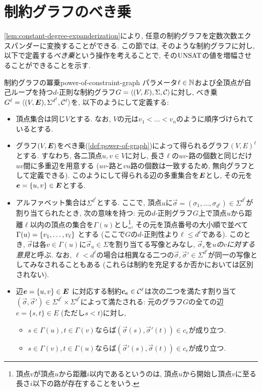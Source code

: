 \section{制約グラフのべき乗}

\cref{lem:constant-degree-expanderization}により, 任意の制約グラフを定数次数エクスパンダーに変換することができる.
この節では, そのような制約グラフに対し, 以下で定義する\emph{べき乗}という操作を考えることで, その$\mathrm{UNSAT}$の値を増幅させることができることを示す.

\begin{definition}{制約グラフの冪乗}{power-of-constraint-graph}
  パラメータ$\ell\in\mathbb{N}$および全頂点が自己ループを持つ$d$-正則な制約グラフ$G=\langle(V,E),\Sigma,\mathcal{C}\rangle$に対し, べき乗$G^\ell = \langle(V,\boldsymbol{E}),\Sigma^{d^{\ell}},\mathcal{C}^\ell\rangle$を, 以下のようにして定義する:
  \begin{itemize}
    \item 頂点集合は同じ$V$とする. なお, $V$の元は$v_1<\dots < v_n$のように順序づけられているとする.
    \item グラフ$(V,\boldsymbol{E})$をべき乗(\cref{def:power-of-graph})によって得られるグラフ$(V,E)^\ell$とする. すなわち, 各二頂点$u,v\in V$に対し, 長さ$\ell$の$uv$-路の個数と同じだけ$uv$間に多重辺を用意する ($uv$-路と$vu$路の個数は一致するため, 無向グラフとして定義できる). このようにして得られる辺の多重集合を$\boldsymbol{E}$とし, その元を$\boldsymbol{e} = \{u,v\} \in \boldsymbol{E}$とする.
    \item アルファベット集合は$\Sigma^{d^{\ell}}$とする. ここで, 頂点$u$に$\vec{\sigma}=(\sigma_1,\dots,\sigma_{d^{\ell}}) \in \Sigma^{d^{\ell}}$が割り当てられたとき, 次の意味を持つ: 元の$d$-正則グラフ$G$上で頂点$u$から距離$\ell$以内の頂点の集合を$\Gamma(u)$とし\footnote{頂点$v$が頂点$u$から距離$i$以内であるというのは, 頂点$u$から開始し頂点$v$に至る長さ$i$以下の路が存在することをいう.}, その元を頂点番号の大小順で並べて$\Gamma(u)=\qty{ v_1,\dots,v_\ell}$ とする (ここで$G$の$d$-正則性より$\ell \le d^{\ell}$である). このとき, $\vec{\sigma}$は各$v\in\Gamma(u)$に$\vec{\sigma}_u\in \Sigma$を割り当てる写像とみなし, $\vec{\sigma}_v$を\emph{$u$の$v$に対する意見}と呼ぶ.
    なお, $\ell < d^{\ell}$の場合は相異なる二つの$\vec{\sigma},\vec{\sigma}'\in\Sigma^{d^{\ell}}$が同一の写像としてみなされることもある (これらは制約を充足するか否かにおいては区別されない).
    \item 辺$\boldsymbol{e} = \{u,v\} \in \boldsymbol{E}$ に対応する制約$\boldsymbol{c}_{\boldsymbol{e}}\in \mathcal{C}^\ell$は次の二つを満たす割り当て$(\vec{\sigma},\vec{\sigma}')\in \Sigma^{d^{\ell}} \times \Sigma^{d^{\ell}}$によって満たされる:
    元のグラフ$G$の全ての辺$e=\{s,t\}\in E$ (ただし$s<t$)に対し,
      \begin{itemize}
        \item $s\in \Gamma(u), t\in\Gamma(v)$ならば$(\vec{\sigma}(s), \vec{\sigma}'(t))\in c_e$が成り立つ.
        \item $s\in\Gamma(v), t\in\Gamma(u)$ならば$(\vec{\sigma}'(s), \vec{\sigma}(t))\in c_e$が成り立つ.
      \end{itemize}
  \end{itemize}
\end{definition}

